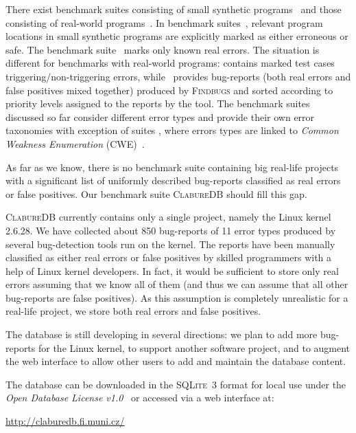 \documentclass[10pt]{llncs}
\newcommand\cdb{\textsc{ClabureDB}\xspace}
\begin{document}
There exist benchmark suites consisting of small synthetic
programs~\cite{CHK11,CHK09,KRA05,NCH05,SRD} and those consisting of
real-world programs~\cite{CHK09,HW08,LLQ05}. In benchmark
suites~\cite{CHK11,KRA05,NCH05}, relevant program locations in small
synthetic programs are explicitly marked as either erroneous or safe. The
benchmark suite~\cite{CHK09} marks only known real errors. The situation is
different for benchmarks with real-world programs: \cite{LLQ05} contains
marked test cases triggering/non-triggering errors, while~\cite{HW08}
provides bug-reports (both real errors and false positives mixed together)
produced by \textsc{Findbugs} and sorted
according to priority levels assigned to the reports by the tool. The
benchmark suites discussed so far consider different error types and provide
their own error taxonomies with exception of suites \cite{CHK11,CHK09},
where errors types are linked to \emph{Common Weakness Enumeration}
(\textsc{CWE})~\cite{cwe}.

As far as we know, there is no benchmark suite containing big real-life
projects with a significant list of uniformly described bug-reports
classified as real errors or false positives. Our benchmark suite \cdb
should fill this gap.

\cdb currently contains only a single project, namely the Linux kernel
2.6.28. We have collected about 850 bug-reports of 11 error types produced
by several bug-detection tools run on the kernel. The reports have been
manually classified as either real errors or false positives by skilled
programmers with a help of Linux kernel developers. In fact, it would be
sufficient to store only real errors assuming that we know all of them (and
thus we can assume that all other bug-reports are false positives). As this
assumption is completely unrealistic for a real-life project, we store both
real errors and false positives.

The database is still developing in several directions: we plan to add more
bug-reports for the Linux kernel, to support another software project, and to
augment the web interface to allow other users to add and maintain the
database content.

The database can be downloaded in the \textsc{SQLite~3} format for local use
under the \emph{Open Database License v1.0}~\cite{ODbL} or accessed via a web
interface at:
\begin{center}
  \url{http://claburedb.fi.muni.cz/}
\end{center}
\end{document}
